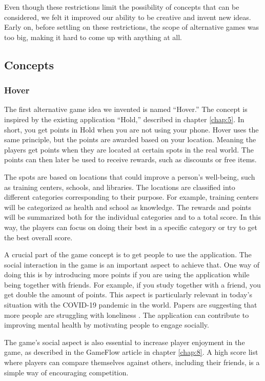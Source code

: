 \documentclass[../Main.tex]{subfiles}
\begin{document}
Even though these restrictions limit the possibility of concepts that can be considered, we felt it improved our ability to be creative and invent new ideas. Early on, before settling on these restrictions, the scope of alternative games was too big, making it hard to come up with anything at all.

\subsection{Concepts}
\subsubsection{Hover}
The first alternative game idea we invented is named “Hover.” The concept is inspired by the existing application “Hold,” described in chapter \ref{chap:5}. In short, you get points in Hold when you are not using your phone. Hover uses the same principle, but the points are awarded based on your location. Meaning the players get points when they are located at certain spots in the real world. The points can then later be used to receive rewards, such as discounts or free items.

The spots are based on locations that could improve a person’s well-being, such as training centers, schools, and libraries. The locations are classified into different categories corresponding to their purpose. For example, training centers will be categorized as health and school as knowledge. The rewards and points will be summarized both for the individual categories and to a total score. In this way, the players can focus on doing their best in a specific category or try to get the best overall score. 

A crucial part of the game concept is to get people to use the application. The social interaction in the game is an important aspect to achieve that. One way of doing this is by introducing more points if you are using the application while being together with friends. For example, if you study together with a friend, you get double the amount of points. This aspect is particularly relevant in today’s situation with the COVID-19 pandemic in the world. Papers are suggesting that more people are struggling with loneliness \citep{groarke_loneliness_2020}. The application can contribute to improving mental health by motivating people to engage socially.

The game’s social aspect is also essential to increase player enjoyment in the game, as described in the GameFlow article in chapter \ref{chap:8}. A high score list where players can compare themselves against others, including their friends, is a simple way of encouraging competition. 
\end{document}
